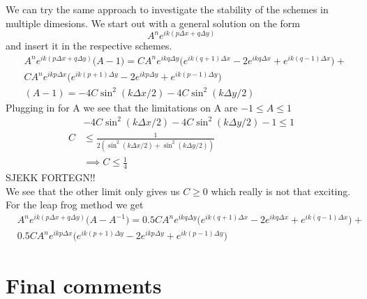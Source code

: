 \documentclass[a4paper,english, 10pt, twoside]{article}
\begin{document}
We can try the same approach to investigate the stability of the schemes in multiple dimesions. We start out with a general 
solution on the form
\begin{equation*}
 A^ne^{ik(p\Delta x +q\Delta y)}
\end{equation*}
and insert it in the respective schemes.
\begin{align*}
 &A^ne^{ik(p\Delta x +q\Delta y)}\big(A-1\big) = CA^ne^{ikq\Delta y}\big(e^{ik(q+1)\Delta x} -2e^{ikq\Delta x}+e^{ik(q-1)\Delta x}\big)+\\
 &CA^ne^{ikp\Delta x}\big(e^{ik(p+1)\Delta y} -2e^{ikp\Delta y} +e^{ik(p-1)\Delta y}\big) \\
 &(A-1) = -4C\sin^2(k\Delta x/2) -4C\sin^2(k\Delta y/2)
\end{align*}
Plugging in for A we see that the limitations on A are $-1 \leq A \leq 1$
\begin{align*}
 &-4C\sin^2(k\Delta x/2) -4C\sin^2(k\Delta y/2)-1 \leq 1 \\
 C &\leq \frac{1}{2(\sin^2(k\Delta x/2) +\sin^2(k\Delta y/2))} \\
 &\implies C \leq \frac{1}{4}
\end{align*}
SJEKK FORTEGN!!\\
We see that the other limit only gives us $C\geq 0$ which really is not that exciting. For the leap frog method we get
\begin{align*}
  &A^ne^{ik(p\Delta x +q\Delta y)}\big(A-A^{-1}\big) = 0.5CA^ne^{ikq\Delta y}\big(e^{ik(q+1)\Delta x} -2e^{ikq\Delta x}+e^{ik(q-1)\Delta x}\big)+\\
 &0.5CA^ne^{ikp\Delta x}\big(e^{ik(p+1)\Delta y} -2e^{ikp\Delta y} +e^{ik(p-1)\Delta y}\big)
\end{align*}

\section{Final comments}
\end{document}
